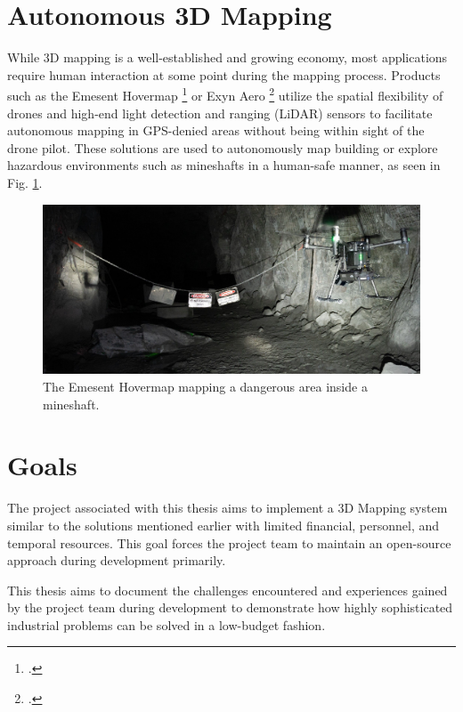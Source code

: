 \section{Autonomous 3D Mapping}
While 3D mapping is a well-established and growing economy, most applications require human interaction at some point during the mapping process. Products such as the Emesent Hovermap \footcite{hovermap2021} or Exyn Aero \footcite{exynAero2021} utilize the spatial flexibility of drones and high-end light detection and ranging (LiDAR) sensors to facilitate autonomous mapping in GPS-denied areas without being within sight of the drone pilot. These solutions are used to autonomously map building or explore hazardous environments such as mineshafts in a human-safe manner, as seen in Fig. \ref{fig:hovermap}.

\begin{figure}
	\centering
	\includegraphics[width=0.9\linewidth]{img/hovermap}
	\caption{
		The Emesent Hovermap mapping a dangerous area inside a mineshaft.\protect\footnotemark
	}
	\label{fig:hovermap}
\end{figure}

\section{Goals}
The project associated with this thesis aims to implement a 3D Mapping system similar to the solutions mentioned earlier with limited financial, personnel, and temporal resources. This goal forces the project team to maintain an open-source approach during development primarily.

This thesis aims to document the challenges encountered and experiences gained by the project team during development to demonstrate how highly sophisticated industrial problems can be solved in a low-budget fashion. 


